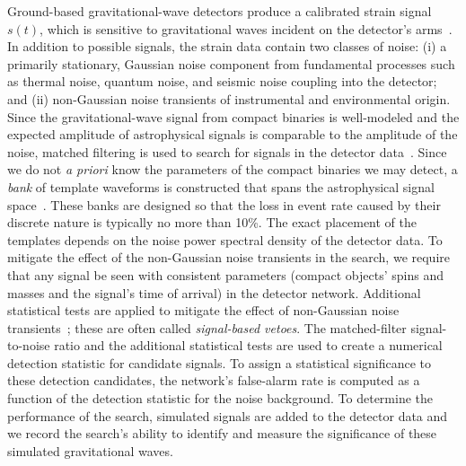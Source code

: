 \documentclass[12pt]{iopart} \usepackage{graphicx,amssymb}
\begin{document}
Ground-based gravitational-wave detectors produce a calibrated strain signal
$s(t)$, which is sensitive to gravitational waves incident on the detector's
arms~\cite{Abadie:2010px}. In addition to possible signals, the strain data contain two classes of
noise: (i) a primarily stationary, Gaussian noise component from fundamental
processes such as thermal noise, quantum noise, and seismic noise coupling
into the detector; and (ii) non-Gaussian noise transients of instrumental and
environmental origin. Since the gravitational-wave signal from compact
binaries is well-modeled and the expected amplitude of astrophysical signals is
comparable to the amplitude of the noise,
matched filtering is used to search for signals in the detector data~\cite{Allen:2005fk}.  Since
we do not \emph{a priori} know the parameters of the compact
binaries we may detect, a \emph{bank} of template waveforms is constructed that spans the astrophysical
signal space~\cite{Sathyaprakash:1991mt,Dhurandhar:1992mw,Owen:1995tm,Owen:1998dk,Babak:2006ty,Cokelaer:2007kx,Brown:2012qf,Keppel:2013yia,Keppel:2013uma}. These banks are designed so that the loss in event rate caused by
their discrete nature is typically no more than 10\%. The exact placement of the
templates depends on the noise power spectral density of the detector data. To
mitigate the effect of the non-Gaussian noise transients in the search, we
require that any signal be seen with consistent parameters (compact objects'
spins and masses and the signal's time of arrival) in the detector network. Additional
statistical tests are applied to mitigate the effect of non-Gaussian
noise transients~\cite{Allen:2004gu}; these are often called \emph{signal-based vetoes}. The 
matched-filter signal-to-noise ratio and the additional statistical tests are used to
create a numerical detection statistic for candidate signals. To assign a
statistical significance to these detection candidates, the network's false-alarm rate is computed as a function of the detection statistic for the
noise background.  To determine the performance of the search, simulated
signals are added to the detector data and we record the search's ability to
identify and measure the significance of these simulated gravitational waves.
\end{document}

